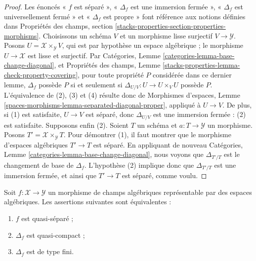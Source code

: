 \begin{proof}
Les énoncés « $f$ est séparé », « $\Delta_f$ est une immersion fermée »,
« $\Delta_f$ est universellement fermé » et « $\Delta_f$ est propre » font
référence aux notions définies dans Propriétés des champs,
section \ref{stacks-properties-section-properties-morphisms}. Choisissons un
schéma $V$ et un morphisme lisse surjectif $V\to\mathcal{Y}$. Posons
$U=\mathcal{X}\times_\mathcal{Y}V$, qui est par hypothèse un espace
algébrique ; le morphisme $U\to\mathcal{X}$ est lisse et surjectif. Par
Catégories, Lemme \ref{categories-lemma-base-change-diagonal}, et Propriétés
des champs, Lemme \ref{stacks-properties-lemma-check-property-covering}, pour
toute propriété $P$ considérée dans ce dernier lemme, $\Delta_f$ possède $P$
si et seulement si $\Delta_{U/V}:U\to U\times_VU$ possède $P$. L'équivalence
de (2), (3) et (4) résulte donc de Morphismes d'espaces, Lemme
\ref{spaces-morphisms-lemma-separated-diagonal-proper}, appliqué à $U\to V$.
De plus, si (1) est satisfaite, $U\to V$ est séparé, donc
$\Delta_{U/V}$ est une immersion fermée : (2) est satisfaite. Supposons enfin
(2). Soient $T$ un schéma et $a:T\to\mathcal{Y}$ un morphisme. Posons
$T'=\mathcal{X}\times_\mathcal{Y}T$. Pour démontrer (1), il faut montrer que
le morphisme d'espaces algébriques $T'\to T$ est séparé. En appliquant de
nouveau Catégories, Lemme \ref{categories-lemma-base-change-diagonal}, nous
voyons que $\Delta_{T'/T}$ est le changement de base de $\Delta_f$.
L'hypothèse (2) implique donc que $\Delta_{T'/T}$ est une immersion fermée,
et ainsi que $T'\to T$ est séparé, comme voulu.
\end{proof}

\begin{lemma}
\label{lemma-representable-quasi-separated-diagonal-quasi-compact}
Soit $f:\mathcal{X}\to\mathcal{Y}$ un morphisme de champs algébriques
représentable par des espaces algébriques. Les assertions suivantes sont
équivalentes :
\begin{enumerate}
\item $f$ est quasi-séparé ;
\item $\Delta_f$ est quasi-compact ;
\item $\Delta_f$ est de type fini.
\end{enumerate}
\end{lemma}

